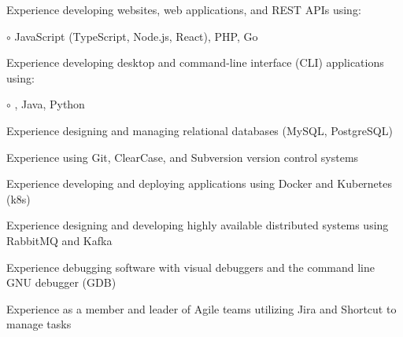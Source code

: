 \begin{itemize*}
  \item Experience developing websites, web applications, and REST APIs using: %
  \begin{itemize*}
    \vspace{-0.2em}
    \item[$\circ$] JavaScript (TypeScript, Node.js, React), PHP, Go
    \vspace{-0.2em}
  \end{itemize*}
  \item Experience developing desktop and command-line interface (CLI) applications using: %
  \begin{itemize*}
    \vspace{-0.2em}
    \item[$\circ$] \CPP, Java, Python
    \vspace{-0.2em}
  \end{itemize*}
  \item Experience designing and managing relational databases (MySQL, PostgreSQL)
  \item Experience using Git, ClearCase, and Subversion version control systems
  \item Experience developing and deploying applications using Docker and Kubernetes (k8s)
  \item Experience designing and developing highly available distributed systems using RabbitMQ and Kafka
  \item Experience debugging software with visual debuggers and the command line GNU debugger (GDB)
  \item Experience as a member and leader of Agile teams utilizing Jira and Shortcut to manage tasks
\end{itemize*}


